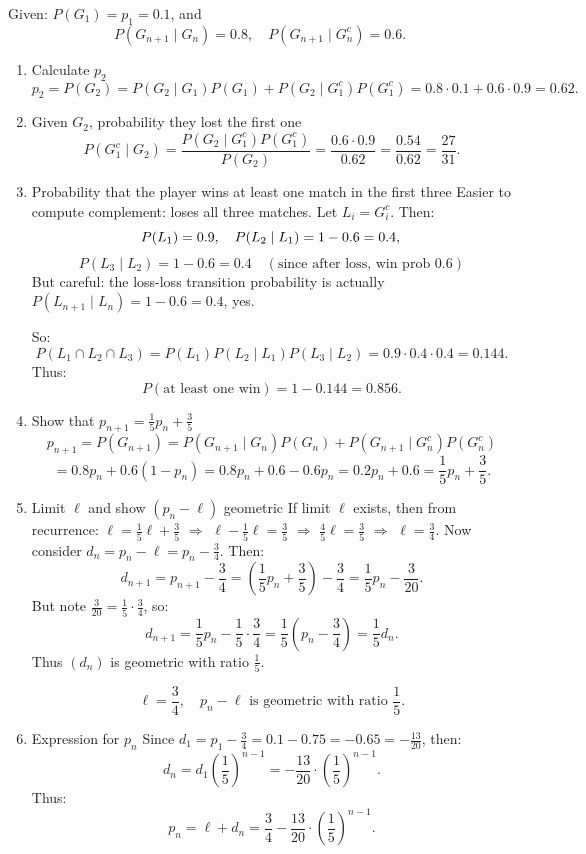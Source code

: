 \documentclass[12pt]{article}
\begin{document}
\begin{answerbox}
Given: \( P(G_1) = p_1 = 0.1 \), and
\[
P(G_{n+1} \mid G_n) = 0.8, \quad P(G_{n+1} \mid G_n^c) = 0.6.
\]

\begin{enumerate}
  \item Calculate \( p_2 \)
\[
p_2 = P(G_2) = P(G_2 \mid G_1)P(G_1) + P(G_2 \mid G_1^c)P(G_1^c)
= 0.8 \cdot 0.1 + 0.6 \cdot 0.9  = 0.62.
\]

  \item Given \( G_2 \), probability they lost the first one
\[
P(G_1^c \mid G_2) = \frac{P(G_2 \mid G_1^c) P(G_1^c)}{P(G_2)} = \frac{0.6 \cdot 0.9}{0.62} = \frac{0.54}{0.62} = \frac{27}{31}.
\]

  \item Probability that the player wins at least one match in the first three
Easier to compute complement: loses all three matches.
Let \( L_i = G_i^c \). Then:
$$
P(L_1) = 0.9, \quad P(L_2 \mid L_1) = 1 - 0.6 = 0.4, \quad \\
$$
$$
P(L_3 \mid L_2) = 1 - 0.6 = 0.4 \quad (\text{since after loss, win prob } 0.6)
$$
But careful: the loss-loss transition probability is actually \( P(L_{n+1} \mid L_n) = 1 - 0.6 = 0.4 \), yes.

So:
\[
P(L_1 \cap L_2 \cap L_3) = P(L_1) P(L_2 \mid L_1) P(L_3 \mid L_2) = 0.9 \cdot 0.4 \cdot 0.4 = 0.144.
\]
Thus:
\[
P(\text{at least one win}) = 1 - 0.144 = 0.856.
\]

  \item Show that \( p_{n+1} = \frac{1}{5} p_n + \frac{3}{5} \)
\[
p_{n+1} = P(G_{n+1}) = P(G_{n+1} \mid G_n) P(G_n) + P(G_{n+1} \mid G_n^c) P(G_n^c)
\]
\[
= 0.8 p_n + 0.6 (1 - p_n) = 0.8 p_n + 0.6 - 0.6 p_n = 0.2 p_n + 0.6 = \frac{1}{5} p_n + \frac{3}{5}.
\]

  \item Limit \( \ell \) and show \( (p_n - \ell) \) geometric
If limit \( \ell \) exists, then from recurrence: \( \ell = \frac{1}{5} \ell + \frac{3}{5} \) \(\Rightarrow\) \( \ell - \frac{1}{5}\ell = \frac{3}{5} \) \(\Rightarrow\) \( \frac{4}{5}\ell = \frac{3}{5} \) \(\Rightarrow\) \( \ell = \frac{3}{4} \).
Now consider \( d_n = p_n - \ell = p_n - \frac{3}{4} \). Then:
\[
d_{n+1} = p_{n+1} - \frac{3}{4} = \left( \frac{1}{5} p_n + \frac{3}{5} \right) - \frac{3}{4} = \frac{1}{5} p_n - \frac{3}{20}.
\]
But note \( \frac{3}{20} = \frac{1}{5} \cdot \frac{3}{4} \), so:
\[
d_{n+1} = \frac{1}{5} p_n - \frac{1}{5} \cdot \frac{3}{4} = \frac{1}{5} \left( p_n - \frac{3}{4} \right) = \frac{1}{5} d_n.
\]
Thus \( (d_n) \) is geometric with ratio \( \frac{1}{5} \).

\[
\ell = \frac{3}{4}, \quad p_n - \ell \text{ is geometric with ratio } \frac{1}{5}.
\]

  \item Expression for \( p_n \)
Since \( d_1 = p_1 - \frac{3}{4} = 0.1 - 0.75 = -0.65 = -\frac{13}{20} \), then:
\[
d_n = d_1 \left( \frac{1}{5} \right)^{n-1} = -\frac{13}{20} \cdot \left( \frac{1}{5} \right)^{n-1}.
\]
Thus:
\[
p_n = \ell + d_n = \frac{3}{4} - \frac{13}{20} \cdot \left( \frac{1}{5} \right)^{n-1}.
\]
\end{enumerate}
\end{answerbox}


\end{document}
